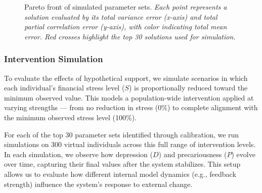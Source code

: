 \documentclass[
]{article}
\begin{document}
\begin{figure}


\caption{\label{fig-pareto}Pareto front of simulated parameter sets.
\emph{Each point represents a solution evaluated by its total variance
error (x-axis) and total partial correlation error (y-axis), with color
indicating total mean error. Red crosses highlight the top 30 solutions
used for simulation.}}

\end{figure}%

\subsubsection{Intervention Simulation}\label{intervention-simulation}

To evaluate the effects of hypothetical support, we simulate scenarios
in which each individual's financial stress level (\(S\)) is
proportionally reduced toward the minimum observed value. This models a
population-wide intervention applied at varying strengths --- from no
reduction in stress (0\%) to complete alignment with the minimum
observed stress level (100\%).

For each of the top 30 parameter sets identified through calibration, we
run simulations on 300 virtual individuals across this full range of
intervention levels. In each simulation, we observe how depression
(\(D\)) and precariousness (\(P\)) evolve over time, capturing their
final values after the system stabilizes. This setup allows us to
evaluate how different internal model dynamics (e.g., feedback strength)
influence the system's response to external change.
\end{document}

